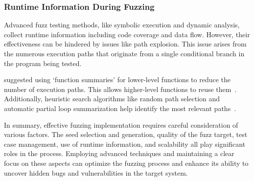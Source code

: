 \subsubsection{Runtime Information During Fuzzing}
Advanced fuzz testing methods, like symbolic execution and dynamic analysis,
collect runtime information including code coverage and data flow. However,
their effectiveness can be hindered by issues like path explosion. This issue
arises from the numerous execution paths that originate from a single
conditional branch in the program being tested.

 suggested using `function summaries'
for lower-level functions to reduce the number of execution paths. This allows
higher-level functions to reuse them~\cite{godefroid2007compositional}. Additionally,
heuristic search algorithms like random path selection and automatic partial
loop summarization help identify the most relevant paths~\cite{liang2018fuzzing}.

In summary, effective fuzzing implementation requires careful consideration of
various factors. The seed selection and generation, quality of the fuzz target,
test case management, use of runtime information, and scalability all play
significant roles in the process. Employing advanced techniques and maintaining
a clear focus on these aspects can optimize the fuzzing process and enhance its
ability to uncover hidden bugs and vulnerabilities in the target system.
\clearpage